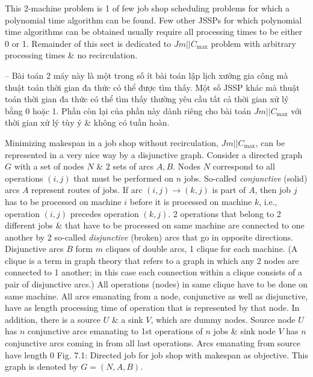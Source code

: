 \documentclass{article}
\begin{document}
\begin{itemize}
\begin{itemize}
        This 2-machine problem is 1 of few job shop scheduling problems for which a polynomial time algorithm can be found. Few other JSSPs for which polynomial time algorithms can be obtained usually require all processing times to be either 0 or 1. Remainder of this sect is dedicated to $Jm||C_{\max}$ problem with arbitrary processing times \& no recirculation.

        -- Bài toán 2 máy này là một trong số ít bài toán lập lịch xưởng gia công mà thuật toán thời gian đa thức có thể được tìm thấy. Một số JSSP khác mà thuật toán thời gian đa thức có thể tìm thấy thường yêu cầu tất cả thời gian xử lý bằng 0 hoặc 1. Phần còn lại của phần này dành riêng cho bài toán $Jm||C_{\max}$ với thời gian xử lý tùy ý \& không có tuần hoàn.

        Minimizing makespan in a job shop without recirculation, $Jm||C_{\max}$, can be represented in a very nice way by a disjunctive graph. Consider a directed graph $G$ with a set of nodes $N$ \& 2 sets of arcs $A,B$. Nodes $N$ correspond to all operations $(i,j)$ that must be performed on $n$ jobs. So-called {\it conjunctive} (solid) arcs $A$ represent routes of jobs. If arc $(i,j)\to(k,j)$ is part of $A$, then job $j$ has to be processed on machine $i$ before it is processed on machine $k$, i.e., operation $(i,j)$ precedes operation $(k,j)$. 2 operations that belong to 2 different jobs \& that have to be processed on same machine are connected to one another by 2 so-called {\it disjunctive} (broken) arcs that go in opposite directions. Disjunctive arcs $B$ form $m$ cliques of double arcs, 1 clique for each machine. (A clique is a term in graph theory that refers to a graph in which any 2 nodes are connected to 1 another; in this case each connection within a clique consists of a pair of disjunctive arcs.) All operations (nodes) in same clique have to be done on same machine. All arcs emanating from a node, conjunctive as well as disjunctive, have as length processing time of operation that is represented by that node. In addition, there is a source $U$ \& a sink $V$, which are dummy nodes. Source node $U$ has $n$ conjunctive arcs emanating to 1st operations of $n$ jobs \& sink node $V$ has $n$ conjunctive arcs coming in from all last operations. Arcs emanating from source have length 0 {\sf Fig. 7.1: Directed job for job shop with makespan as objective}. This graph is denoted by $G = (N,A,B)$.


\end{itemize}
\end{itemize}
\end{document}
